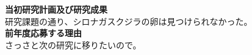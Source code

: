 \documentclass[11pt,a4j,dvipdfmx]{jarticle} 					%
\newcommand{\研究課題名}{象の卵}
\newcommand{\研究機関名}{逢坂大学}
\newcommand{\研究代表者氏名}{湯川秀樹}
\newcommand{\研究期間の最終元号年度}{10}  %
\begin{document}
\newcommand{\最終年度研究種目名}{基盤研究（Z）}
\newcommand{\最終年度研究課題番号}{99999}
\newcommand{\最終年度研究課題名}{シロナガスクジラの卵はなぜ見つけられないのか}
\newcommand{\最終年度研究期間}{平成25年度〜令和\一年目 年度}


\noindent
\textbf{当初研究計画及び研究成果}\\
	研究課題の通り、シロナガスクジラの卵は見つけられなかった。
\\

\noindent
\textbf{前年度応募する理由}\\
	さっさと次の研究に移りたいので。



\end{document}
